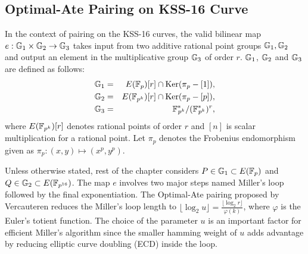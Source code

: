 \subsection{Optimal-Ate Pairing on KSS-16 Curve}
In the context of pairing on the KSS-16 curves, the valid bilinear map $e:{\mathbb{G}}_{1} \times {\mathbb{G}}_{2} \rightarrow {\mathbb{G}}_{3}$ takes input from two additive rational point groups ${\mathbb{G}}_{1}, {\mathbb{G}}_{2}$ 
and output an element in the multiplicative group ${\mathbb{G}}_{3}$ of order $r$. 
${\mathbb{G}}_{1}$, ${\mathbb{G}}_{2}$ and ${\mathbb{G}}_{3}$ are defined as follows:
\begin{eqnarray}
{\mathbb{G}}_{1} & = &  E(\mathbb{F}_p) [r] \cap \text{Ker}(\pi_p - [1]), \nonumber \\
{\mathbb{G}}_{2} & = &  E({\mathbb{F}}_{p^{k}}) [r] \cap \text{Ker}(\pi_p - [p]), \nonumber \\
{\mathbb{G}}_{3} & = & {{\mathbb{F}}^{\ast}}_{\!\!\!p^{k}}/({{\mathbb{F}}^{\ast}}_{\!\!\!p^{k}})^r, \nonumber
\end{eqnarray}
where $E({\mathbb{F}}_{p^{k}})[r]$ denotes rational points of order $r$ and $[n]$ is scalar multiplication for a rational point. 
Let $\pi_p$ denotes the Frobenius endomorphism given as $\pi_p: (x,y) \mapsto (x^p,y^p)$.

Unless otherwise stated, rest of the chapter considers $P \in {\mathbb{G}}_{1} \subset E(\mathbb{F}_p)$ and  $Q \in {\mathbb{G}}_{2} \subset  E(\mathbb{F}_{p^{16}})$. The map $e$ involves two major steps named Miller's loop followed by the final exponentiation.
The Optimal-Ate pairing \cite{DBLP:journals/tit/Vercauteren10} proposed by Vercauteren reduces the Miller's loop length  to $\lfloor \log_2 u \rfloor = \frac{\lfloor \log_2 r \rfloor }{\varphi(k)} $, where $\varphi$ is the Euler's totient function.
The choice of the parameter $u$ is an important factor for efficient Miller's algorithm since the smaller hamming weight of $u$ adds advantage by reducing elliptic curve doubling (ECD) inside the loop.

